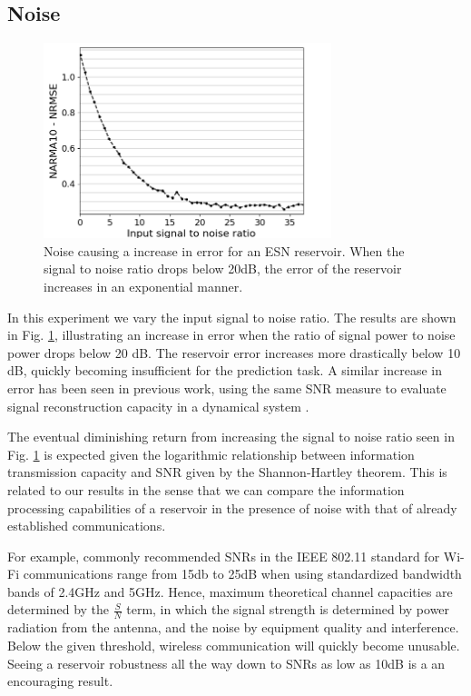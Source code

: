 \subsection{Noise}

\begin{figure}[t!]
  \centering
  \includegraphics[width=3.3in]{img/input_noise_snr.png}
  \caption{
    Noise causing a increase in error for an ESN reservoir. When the signal to
noise ratio drops below 20dB, the error of the reservoir increases in an
exponential manner.
  }
  \label{input_noise_snr}
\end{figure}

In this experiment we vary the input signal to noise ratio. The results are
shown in Fig. \ref{input_noise_snr}, illustrating an increase in error when the
ratio of signal power to noise power drops below 20 dB. The reservoir error
increases more drastically below 10 dB, quickly becoming insufficient for the
prediction task. A similar increase in error has been seen in previous work,
using the same SNR measure to evaluate signal reconstruction capacity in a
dynamical system \cite{dambre_information_2012}.

The eventual diminishing return from increasing the signal to noise ratio seen
in Fig. \ref{input_noise_snr} is expected given the logarithmic relationship
between information transmission capacity and SNR given by the Shannon-Hartley
theorem. This is related to our results in the sense that we can compare the
information processing capabilities of a reservoir in the presence of noise with
that of already established communications.

For example, commonly recommended SNRs in the IEEE 802.11 standard for Wi-Fi
communications range from 15db to 25dB when using standardized bandwidth bands
of 2.4GHz and 5GHz. Hence, maximum theoretical channel capacities are determined
by the $\frac{S}{N}$ term, in which the signal strength is determined by power
radiation from the antenna, and the noise by equipment quality and
interference. Below the given threshold, wireless communication will quickly
become unusable. Seeing a reservoir robustness all the way down to SNRs as low
as 10dB is a an encouraging result.

